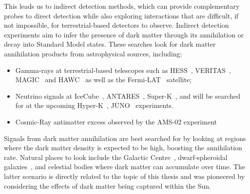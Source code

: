 This leads us to indirect detection methods, which can provide complementary probes to direct detection while also exploring interactions that are difficult, if not impossible, for terrestrial-based detectors to observe.
Indirect detection experiments aim to infer the presence of dark matter through its annihilation or decay into Standard Model states. 
These searches look for dark matter annihilation products from astrophysical sources, including:
\begin{itemize}
    \item Gamma-rays at terrestrial-based telescopes such as HESS~\cite{HESS:2018cbt_may_SearchgRayLine, Montanari:2023bzn_jul_Searchdarkmatter, HESS:2006zwn_ObservationsGalacticCenter}, VERITAS~\cite{VERITAS:2017tif_apr_DarkMatterConstraints, Ryan:2023yzu_jul_SearchDarkMatter, McGrath:2023oto_jul_IndirectsearchDark, Ryan:2023yzu_jul_SearchDarkMatter}, MAGIC~\cite{MAGIC:2009tyk_MAGICGammaRayTelescope, MAGIC:2011nta_SearchesDarkMatter, MAGIC:2011nta_SearchesDarkMatter, MAGIC:2009tyk_MAGICGammaRayTelescope} and HAWC~\cite{HAWC:2017mfa_feb_DarkMatterLimits, HAWC:2017udy_feb_SearchDarkMatter, HAWC:2017udy_feb_SearchDarkMatter, HAWC:2017mfa_feb_DarkMatterLimits, Proper:2015xya_jul_FirstLimitsDark, Harding:2015bua_jul_DarkMatterAnnihilation} as well as the Fermi-LAT~\cite{Fermi-LAT:2015att_nov_SearchingDarkMatter,Fermi-LAT:2015kyq_jun_UpdatedSearchSpectral,Fermi-LAT:2012ugx_FermiLATSearch, Fermi-LAT:2010qeq_ConstraintsCosmologicalDark, Su:2010qj_GiantGammarayBubbles} satellite;

    \item Neutrino signals at IceCube~\cite{IceCube:2016dgk_mar_Searchannihilatingdark, IceCube:2012ugg_mar_Searchdarkmatter}, ANTARES~\cite{ANTARES:2016bxz_jun_SearchDarkMatter,ANTARES:2016obx_may_SearchSecludedDark,ANTARES:2016xuh_aug_LimitsDarkMatter}, Super-K~\cite{Super-Kamiokande:2015xms_apr_Searchneutrinosannihilation,Super-Kamiokande:2004pou_Searchdarkmatter,Feng:2008qn_TestingDarkMatter}, and will be searched for at the upcoming Hyper-K~\cite{Bell:2020rkw_sep_SearchingSubGeVDark,Bell:2021esh_nov_Searchingdarkmatter,Bell:2022ycf_nov_Darkmatterpollution}, JUNO~\cite{Franarin:2018gfk_jun_JUNOSensitivityResonant} experiments.

    \item Cosmic-Ray antimatter excess observed by the AMS-02 experiment~\cite{Giesen:2015ufa_sep_AMS02antiprotonslast, Bergstrom:2013jra_oct_NewLimitsDark}
\end{itemize}

Signals from dark matter annihilation are best searched for by looking at regions where the dark matter density is expected to be high, boosting the annihilation rate. 
Natural places to look include the Galactic Centre~\cite{Ipek:2014gua_sep_RenormalizableModelGalactic, Fermi-LAT:2017opo_may_FermiGalacticCenter}, dwarf-spheroidal galaxies~\cite{Bonnivard:2015xpq_oct_Darkmatterannihilation}, and celestial bodies where dark matter can accumulate over time. The latter scenario is directly related to the topic of this thesis and was pioneered by considering the effects of dark matter being captured within the Sun.



